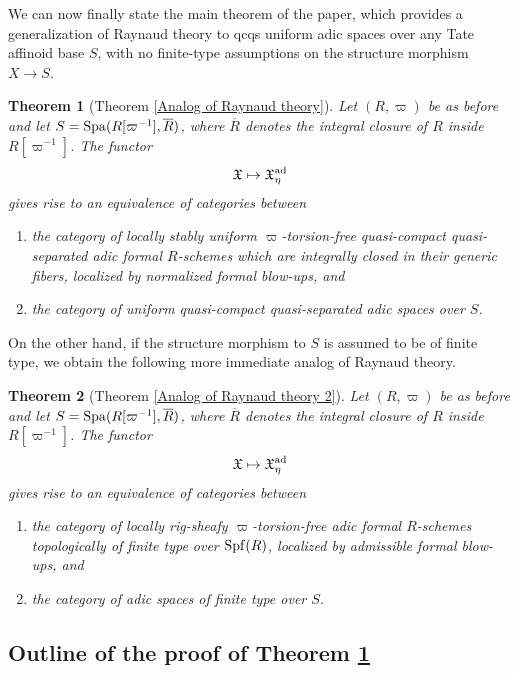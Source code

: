 \documentclass[12pt,twoside,a4paper]{article}
\newtheorem{thm}{Theorem}[section]
\theoremstyle{definition}
\theoremstyle{remark}
\newcommand\ad{{\rm ad}}
\newcommand\Spa{{\rm Spa}}
\newcommand\Spf{{\rm Spf}}
\begin{document}
We can now finally state the main theorem of the paper, which provides a generalization of Raynaud theory to qcqs uniform adic spaces over any Tate affinoid base $S$, with no finite-type assumptions on the structure morphism $X\to S$.
\begin{thm}[Theorem \ref{Analog of Raynaud theory}]\label{Main theorem}Let $(R, \varpi)$ be as before and let $S=\Spa(R[\varpi^{-1}], \overline{R})$, where $\overline{R}$ denotes the integral closure of $R$ inside $R[\varpi^{-1}]$. The functor\begin{equation*}\mathfrak{X}\mapsto \mathfrak{X}_{\eta}^{\ad}\end{equation*}gives rise to an equivalence of categories between \begin{enumerate}[(1)]\item the category of locally stably uniform $\varpi$-torsion-free quasi-compact quasi-separated adic formal $R$-schemes which are integrally closed in their generic fibers, localized by normalized formal blow-ups, and 
\item the category of uniform quasi-compact quasi-separated adic spaces over $S$.\end{enumerate}\end{thm}
On the other hand, if the structure morphism to $S$ is assumed to be of finite type, we obtain the following more immediate analog of Raynaud theory. 
\begin{thm}[Theorem \ref{Analog of Raynaud theory 2}]\label{Main theorem 2}Let $(R, \varpi)$ be as before and let $S=\Spa(R[\varpi^{-1}], \overline{R})$, where $\overline{R}$ denotes the integral closure of $R$ inside $R[\varpi^{-1}]$. The functor\begin{equation*}\mathfrak{X}\mapsto \mathfrak{X}_{\eta}^{\ad}\end{equation*}gives rise to an equivalence of categories between \begin{enumerate}[(1)]\item the category of locally rig-sheafy $\varpi$-torsion-free adic formal $R$-schemes topologically of finite type over $\Spf(R)$, localized by admissible formal blow-ups, and \item the category of adic spaces of finite type over $S$.\end{enumerate}\end{thm}

\subsection{Outline of the proof of Theorem \ref{Main theorem}}
\end{document}
